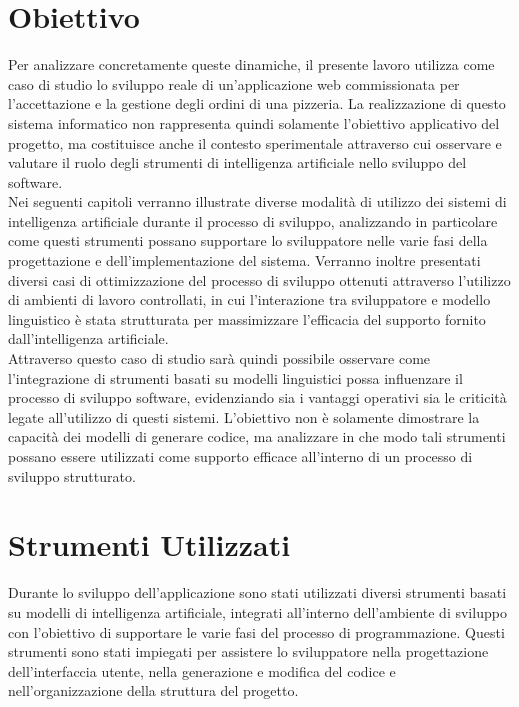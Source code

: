 \section{Obiettivo}
Per analizzare concretamente queste dinamiche, il presente lavoro utilizza come caso di studio lo sviluppo reale di un'applicazione web commissionata per l'accettazione e la gestione degli ordini di una pizzeria. La realizzazione di questo sistema informatico non rappresenta quindi solamente l'obiettivo applicativo del progetto, ma costituisce anche il contesto sperimentale attraverso cui osservare e valutare il ruolo degli strumenti di intelligenza artificiale nello sviluppo del software.
\\
Nei seguenti capitoli verranno illustrate diverse modalità di utilizzo dei sistemi di intelligenza artificiale durante il processo di sviluppo, analizzando in particolare come questi strumenti possano supportare lo sviluppatore nelle varie fasi della progettazione e dell'implementazione del sistema. Verranno inoltre presentati diversi casi di ottimizzazione del processo di sviluppo ottenuti attraverso l'utilizzo di ambienti di lavoro controllati, in cui l'interazione tra sviluppatore e modello linguistico è stata strutturata per massimizzare l'efficacia del supporto fornito dall'intelligenza artificiale.
\\
Attraverso questo caso di studio sarà quindi possibile osservare come l'integrazione di strumenti basati su modelli linguistici possa influenzare il processo di sviluppo software, evidenziando sia i vantaggi operativi sia le criticità legate all'utilizzo di questi sistemi. L'obiettivo non è solamente dimostrare la capacità dei modelli di generare codice, ma analizzare in che modo tali strumenti possano essere utilizzati come supporto efficace all'interno di un processo di sviluppo strutturato.


\section{Strumenti Utilizzati}


Durante lo sviluppo dell'applicazione sono stati utilizzati diversi strumenti basati su modelli di intelligenza artificiale, integrati all'interno dell'ambiente di sviluppo con l'obiettivo di supportare le varie fasi del processo di programmazione. Questi strumenti sono stati impiegati per assistere lo sviluppatore nella progettazione dell'interfaccia utente, nella generazione e modifica del codice e nell'organizzazione della struttura del progetto.
